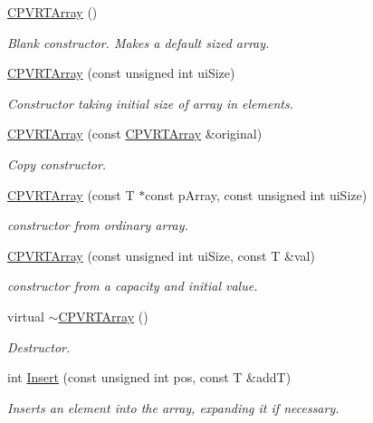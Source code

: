 \begin{DoxyCompactItemize}
\item 
\hyperlink{class_c_p_v_r_t_array_a836bda39fa4e1265cb456c1fb6b53c26}{C\+P\+V\+R\+T\+Array} ()
\begin{DoxyCompactList}\small\item\em Blank constructor. Makes a default sized array. \end{DoxyCompactList}\item 
\hyperlink{class_c_p_v_r_t_array_aafbaae45136d40df92436727b43b8655}{C\+P\+V\+R\+T\+Array} (const unsigned int ui\+Size)
\begin{DoxyCompactList}\small\item\em Constructor taking initial size of array in elements. \end{DoxyCompactList}\item 
\hyperlink{class_c_p_v_r_t_array_ab21689aaa4baa6d1d46240b32facc124}{C\+P\+V\+R\+T\+Array} (const \hyperlink{class_c_p_v_r_t_array}{C\+P\+V\+R\+T\+Array} \&original)
\begin{DoxyCompactList}\small\item\em Copy constructor. \end{DoxyCompactList}\item 
\hyperlink{class_c_p_v_r_t_array_a513bb2234a742c40a9cd0cd7ba5025f4}{C\+P\+V\+R\+T\+Array} (const T $\ast$const p\+Array, const unsigned int ui\+Size)
\begin{DoxyCompactList}\small\item\em constructor from ordinary array. \end{DoxyCompactList}\item 
\hyperlink{class_c_p_v_r_t_array_a10c9f10f4122a646c3016141dec13382}{C\+P\+V\+R\+T\+Array} (const unsigned int ui\+Size, const T \&val)
\begin{DoxyCompactList}\small\item\em constructor from a capacity and initial value. \end{DoxyCompactList}\item 
virtual \hyperlink{class_c_p_v_r_t_array_a57fce2facc3d71998e1ef2cd3f1debd6}{$\sim$\+C\+P\+V\+R\+T\+Array} ()
\begin{DoxyCompactList}\small\item\em Destructor. \end{DoxyCompactList}\item 
int \hyperlink{class_c_p_v_r_t_array_aeeac30ce25f3a70530e5bba1a96989af}{Insert} (const unsigned int pos, const T \&add\+T)
\begin{DoxyCompactList}\small\item\em Inserts an element into the array, expanding it if necessary. \end{DoxyCompactList}\item 

\end{DoxyCompactItemize}
